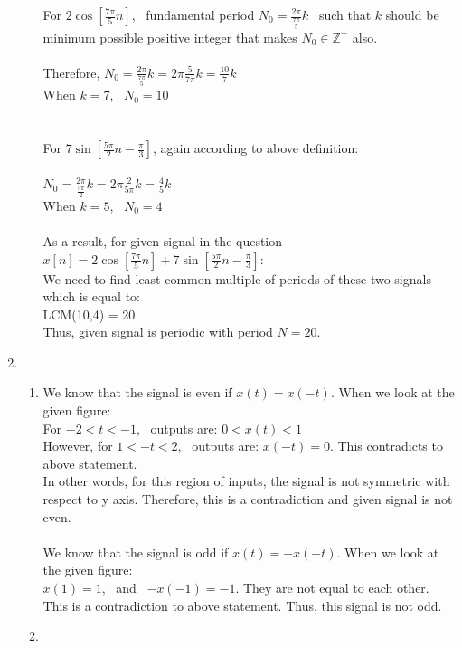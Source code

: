\documentclass[10pt,a4paper, margin=1in]{article}
\begin{document}
\begin{enumerate}
\begin{enumerate}
    For $2 \cos[\frac{7 \pi}{5}n]$, \ fundamental period $N_0 = \frac{2 \pi}{\frac{7 \pi}{5}} k$ \ such that $k$ should be minimum possible positive integer that makes $N_0 \in \mathbb{Z}^+$ also. \\
    \\
    Therefore, $N_0 = \frac{2 \pi}{\frac{7 \pi}{5}} k = 2 \pi \frac{5}{7 \pi} k = \frac{10}{7} k $ \\
    When $k=7$, \ $N_0 = 10$ \\
    \\
    \\
    For $7 \sin[\frac{5 \pi}{2}n - \frac{\pi}{3}]$, again according to above definition: \\
    \\
    $N_0 = \frac{2 \pi}{\frac{5 \pi}{2}} k = 2 \pi \frac{2}{5 \pi} k  = \frac{4}{5} k $ \\
    When $k=5$, \ $N_0 = 4$ \\
    \\
    As a result, for given signal in the question $x[n] = 2 \cos[\frac{7 \pi}{5}n] + 7 \sin[\frac{5 \pi}{2}n - \frac{\pi}{3}]$: \\
    We need to find least common multiple of periods of these two signals which is equal to: \\
    LCM(10,4) = 20 \\
    Thus, given signal is periodic with period $N=20$. 
    \end{enumerate}


\item %
    \begin{enumerate}
    \item %
    We know that the signal is even if $x(t) = x(-t)$. When we look at the given figure: \\
     For $-2 < t < -1$, \ outputs are: $0 < x(t) < 1$ \\
     However, for $1 < -t < 2$, \ outputs are: $x(-t) = 0$. This contradicts to above statement. \\
     In other words, for this region of inputs, the signal is not symmetric with respect to y axis. Therefore, this is a contradiction and given signal is not even.\\
     \\
     We know that the signal is odd if $x(t) = -x(-t)$. When we look at the given figure: \\
     $x(1) = 1$, \ and \ $-x(-1) = -1$. They are not equal to each other. This is a contradiction to above statement. Thus, this signal is not odd. 
    \item %
    

\end{enumerate}
\end{enumerate}
\end{document}
